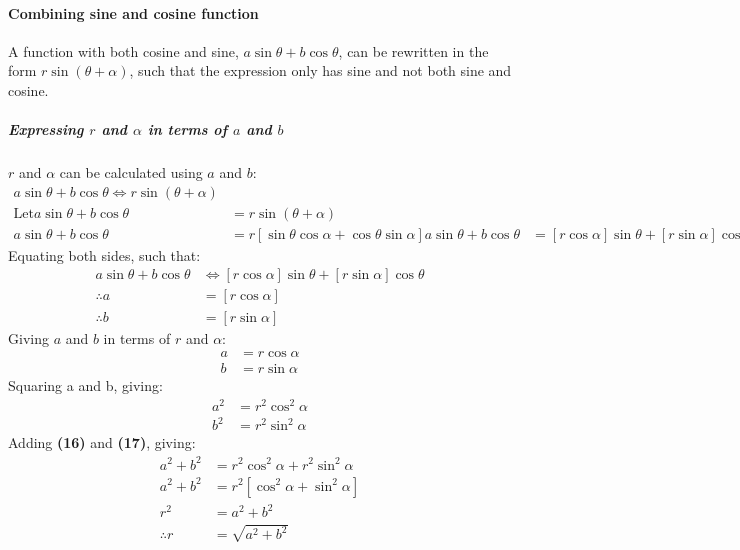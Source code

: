 \documentclass{article}
\begin{document}
        \paragraph{Combining sine and cosine function} A function with both cosine and sine, $a\sin{\theta} + b\cos{\theta}$, can be rewritten in the form $r\sin{(\theta + \alpha)}$, such that the expression only has sine and not both sine and cosine.
        \subparagraph{Expressing $r$ and $\alpha$ in terms of $a$ and $b$} $r$ and $\alpha$ can be calculated using $a$ and $b$:
        \begin{align*}
            a\sin{\theta} + b\cos{\theta} \Leftrightarrow r\sin{(\theta + \alpha)} \\
            \mathrm{Let} a\sin{\theta} + b\cos{\theta} &= r\sin{(\theta + \alpha)} \\
            a\sin{\theta} + b\cos{\theta} &= r[\sin\theta\cos\alpha + \cos\theta\sin\alpha]
            a\sin{\theta} + b\cos{\theta} &= [r\cos\alpha]\sin{\theta} + [r\sin\alpha]\cos{\theta}
        \end{align*}
        Equating both sides, such that:
        \begin{align*}
            a\sin{\theta} + b\cos{\theta} &\Leftrightarrow [r\cos\alpha]\sin{\theta} + [r\sin\alpha]\cos{\theta} \\
            \therefore a &= [r\cos\alpha] \\
            \therefore b &= [r\sin\alpha]
        \end{align*}
        Giving $a$ and $b$ in terms of $r$ and $\alpha$:
        \begin{align}
            a &= r\cos\alpha \\
            b &= r\sin\alpha
        \end{align}
        Squaring a and b, giving:
        \begin{align}
            a^2 &= r^2\cos^2{\alpha} \\
            b^2 &= r^2\sin^2{\alpha}
        \end{align}
        Adding \textbf{(16)} and \textbf{(17)}, giving:
        \begin{align*}
            a^2 + b^2 &= r^2\cos^2{\alpha} + r^2\sin^2{\alpha} \\
            a^2 + b^2 &= r^2[\cos^2{\alpha} + \sin^2{\alpha}] \\
            r^2 &= a^2 + b^2 \\
            \therefore r &= \sqrt{a^2 + b^2}
        \end{align*}
\end{document}
